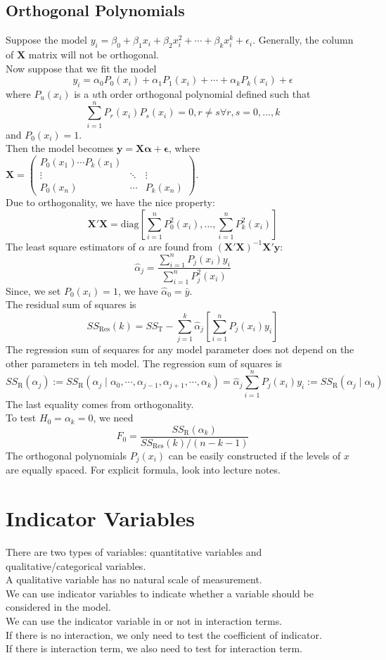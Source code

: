 \documentclass[11pt]{article}
\theoremstyle{definition}
\begin{document}
\subsection{Orthogonal Polynomials}
Suppose the model $y_i=\beta_0+\beta_1x_i+\beta_2x_i^2+\cdots+\beta_kx_i^k+\epsilon_i$. Generally, the column of $\bm{X}$ matrix will not be orthogonal.\\
Now suppose that we fit the model
\[
y_i=\alpha_0P_0(x_i)+\alpha_1P_1(x_i)+\cdots +\alpha_kP_k(x_i)+\epsilon
\]
where $P_u(x_i)$ is a $u$th order orthogonal polynomial defined such that
\[
\sum_{i=1}^n P_r(x_i)P_s(x_i)=0, r\neq s\forall r,s=0,\ldots, k
\]
and $P_0(x_i)=1$.\\
Then the model becomes $\bm{y}=\bm{X\alpha}+\bm{\epsilon}$, where $\bm{X}=\begin{pmatrix}P_0(x_1)\cdots P_k(x_1)\\\vdots &\ddots&\vdots\\P_0(x_n)&\cdots&P_k(x_n)\end{pmatrix}$.\\
Due to orthogonality, we have the nice property:
\[
\bm{X}'\bm{X}=\text{diag}[\sum_{i=1}^n P_0^2(x_i), \ldots, \sum_{i=1}^n P_k^2(x_i)]
\]
The least square estimators of $\alpha$ are found from $(\bm{X}'\bm{X})^{-1}\bm{X}'\bm{y}$:
\[
\hat{\alpha}_j=\frac{\sum_{i=1}^n P_j(x_i)y_i}{\sum_{i=1}^n P_j^2(x_i)}
\]
Since, we set $P_0(x_i)=1$, we have $\hat{\alpha}_0=\bar{y}$.\\
The residual sum of squares is
\[
SS_\text{Res}(k)=SS_\text{T}-\sum_{j=1}^k\hat{\alpha}_j[\sum_{i=1}^n P_j(x_i)y_i]
\]
The regression sum of sequares for any model parameter does not depend on the other parameters in teh model. The regression sum of squares is
\[
SS_\text{R}(\alpha_j):=SS_\text{R}(\alpha_j\mid \alpha_0,\cdots, \alpha_{j-1},\alpha_{j+1},\cdots,\alpha_k)=\hat{\alpha}_j\sum_{i=1}^nP_j(x_i)y_i:=SS_\text{R}(\alpha_j\mid \alpha_0)
\]
The last equality comes from orthogonality.\\
To test $H_0=\alpha_k=0$, we need 
\[
F_0=\frac{SS_\text{R}(\alpha_k)}{SS_\text{Res}(k)/(n-k-1)}
\]
The orthogonal polynomials $P_j(x_i)$ can be easily constructed if the levels of $x$ are equally spaced. For explicit formula, look into lecture notes.
\section{Indicator Variables}
There are two types of variables: quantitative variables and qualitative/categorical variables.\\
A qualitative variable has no natural scale of measurement. \\
We can use indicator variables to indicate whether a variable should be considered in the model.\\
We can use the indicator variable in or not in interaction terms.\\
If there is no interaction, we only need to test the coefficient of indicator.\\
If there is interaction term, we also need to test for interaction term.
\end{document}
